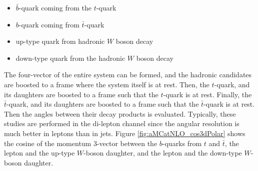\begin{itemize}
  \item $\bar{b}$-quark coming from the $t$-quark
  \item $b$-quark coming from $\bar{t}$-quark
  \item up-type quark from hadronic $W$ boson decay
  \item down-type quark from the hadronic $W$ boson decay
\end{itemize}

\indent The four-vector of the entire \ttbar system can be formed, and
the hadronic candidates are boosted to a frame where the \ttbar system
itself is at rest.  Then, the $t$-quark, and its daughters are boosted to
a frame such that the $t$-quark is at rest.  Finally, the
$\bar{t}$-quark, and its daughters are boosted to a frame such that
the $\bar{t}$-quark is at rest.  Then the angles between their decay
products is evaluated.  Typically, these studies are performed in the
di-lepton channel since the angular resolution is much better in
leptons than in jets.  Figure \ref{fig:aMCatNLO_cos3dPolar} shows the
cosine of the momentum 3-vector between the $b$-quarks from $t$ and
$\bar{t}$, the lepton and the up-type $W$-boson daughter, and the
lepton and the down-type $W$-boson daughter.   

